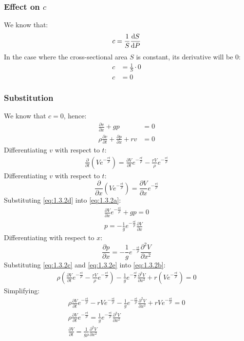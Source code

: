 \documentclass[11pt]{article}
\numberwithin{equation}{section}
\begin{document}
\subsubsection{Effect on $c$}
We know that:
\begin{equation}
    c = \frac{1}{S}\frac{\dif S}{\dif P}
\end{equation}
In the case where the cross-sectional area $S$ is constant, its derivative will be 0:
\begin{align}
    c &= \frac{1}{S} \cdot 0\\
    c &= 0
\end{align}
\subsubsection{Substitution}
We know that $c = 0$, hence:
\begin{align}
    \frac{\partial v}{\partial x} + gp &= 0 \label{eq:1.3.2a}\\
    \rho \frac{\partial v}{\partial t} + \frac{\partial p}{\partial x}+ rv &= 0 \label{eq:1.3.2b}
\end{align}
Differentiating $v$ with respect to $t$:
\begin{align}
    \frac{\partial }{\partial t} \left(V e^{-\frac{rt}{\rho}}\right) = \frac{\partial V }{\partial t} e^{-\frac{rt}{\rho}} - \frac{rV}{\rho} e^{-\frac{rt}{\rho}} \label{eq:1.3.2c}
\end{align}
Differentiating $v$ with respect to $t$:
\begin{equation}
    \frac{\partial }{\partial x} \left(V e^{-\frac{rt}{\rho}}\right) = \frac{\partial V}{\partial x} e^{-\frac{rt}{\rho}} \label{eq:1.3.2d}
\end{equation}
Substituting \ref{eq:1.3.2d} into \ref{eq:1.3.2a}:
\begin{gather}
    \frac{\partial V}{\partial x} e^{-\frac{rt}{\rho}} + gp = 0\\
    p = -\frac{1}{g}e^{-\frac{rt}{\rho}}\frac{\partial V}{\partial x}
\end{gather}
Differentiating with respect to $x$:
\begin{equation}
    \frac{\partial p}{\partial x} = - \frac{1}{g}e^{-\frac{rt}{\rho}}\frac{\partial^2 V}{\partial x^2} \label{eq:1.3.2e}
\end{equation}
Substituting \ref{eq:1.3.2c} and \ref{eq:1.3.2e} into \ref{eq:1.3.2b}:
\begin{gather}
    \rho\left(\frac{\partial V }{\partial t} e^{-\frac{rt}{\rho}} - \frac{rV}{\rho} e^{-\frac{rt}{\rho}}\right) - \frac{1}{g}e^{-\frac{rt}{\rho}}\frac{\partial^2 V}{\partial x^2} + r\left(V e^{-\frac{rt}{\rho}}\right) = 0
\end{gather}
Simplifying:
\begin{gather}
    \rho \frac{\partial V }{\partial t} e^{-\frac{rt}{\rho}} - rVe^{-\frac{rt}{\rho}}- \frac{1}{g}e^{-\frac{rt}{\rho}}\frac{\partial^2 V}{\partial x^2} + rVe^{-\frac{rt}{\rho}} = 0\\
    \rho \frac{\partial V }{\partial t} e^{-\frac{rt}{\rho}} = \frac{1}{g}e^{-\frac{rt}{\rho}}\frac{\partial^2 V}{\partial x^2}\\
    \frac{\partial V }{\partial t} = \frac{1}{g\rho}\frac{\partial^2 V}{\partial x^2}
\end{gather}
\end{document}
